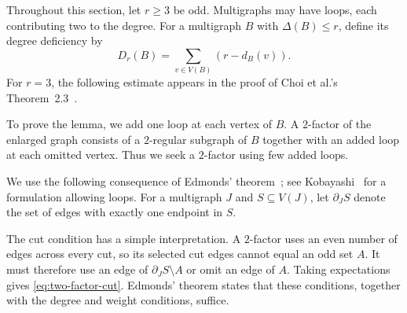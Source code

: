 \documentclass[10pt,a4paper]{amsart}
\newtheorem{lemma}[theorem]{Lemma}
\newcommand{\Prob}{\mathbb P}
\begin{document}
Throughout this section, let $r\ge3$ be odd. Multigraphs may have loops, each contributing two to the degree. For a multigraph $B$ with $\Delta(B)\le r$, define its degree deficiency by
\[
D_r(B)=\sum_{v\in V(B)}(r-d_B(v)).
\]
For $r=3$, the following estimate appears in the proof of Choi et al.'s Theorem~2.3~\cite{CKKPW2019}.


To prove the lemma, we add one loop at each vertex of $B$. A $2$-factor of the enlarged graph consists of a $2$-regular subgraph of $B$ together with an added loop at each omitted vertex. Thus we seek a $2$-factor using few added loops.

We use the following consequence of Edmonds' theorem~\cite{Edmonds1965}; see Kobayashi~\cite[Section~2]{Kobayashi2022} for a formulation allowing loops. For a multigraph $J$ and $S\subseteq V(J)$, let $\partial_J S$ denote the set of edges with exactly one endpoint in $S$.


The cut condition has a simple interpretation. A $2$-factor uses an even number of edges across every cut, so its selected cut edges cannot equal an odd set $A$. It must therefore use an edge of $\partial_J S\setminus A$ or omit an edge of $A$. Taking expectations gives \eqref{eq:two-factor-cut}. Edmonds' theorem states that these conditions, together with the degree and weight conditions, suffice.
\end{document}
